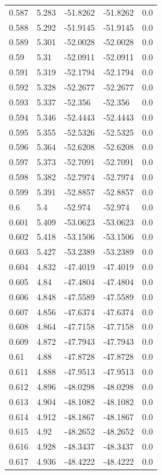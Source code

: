 \begin{table}[H]
\begin{tabular}{lllll}
0.587 & 5.283 & -51.8262 & -51.8262 & 0.0 \\
0.588 & 5.292 & -51.9145 & -51.9145 & 0.0 \\
0.589 & 5.301 & -52.0028 & -52.0028 & 0.0 \\
0.59 & 5.31 & -52.0911 & -52.0911 & 0.0 \\
0.591 & 5.319 & -52.1794 & -52.1794 & 0.0 \\
0.592 & 5.328 & -52.2677 & -52.2677 & 0.0 \\
0.593 & 5.337 & -52.356 & -52.356 & 0.0 \\
0.594 & 5.346 & -52.4443 & -52.4443 & 0.0 \\
0.595 & 5.355 & -52.5326 & -52.5325 & 0.0 \\
0.596 & 5.364 & -52.6208 & -52.6208 & 0.0 \\
0.597 & 5.373 & -52.7091 & -52.7091 & 0.0 \\
0.598 & 5.382 & -52.7974 & -52.7974 & 0.0 \\
0.599 & 5.391 & -52.8857 & -52.8857 & 0.0 \\
0.6 & 5.4 & -52.974 & -52.974 & 0.0 \\
0.601 & 5.409 & -53.0623 & -53.0623 & 0.0 \\
0.602 & 5.418 & -53.1506 & -53.1506 & 0.0 \\
0.603 & 5.427 & -53.2389 & -53.2389 & 0.0 \\
0.604 & 4.832 & -47.4019 & -47.4019 & 0.0 \\
0.605 & 4.84 & -47.4804 & -47.4804 & 0.0 \\
0.606 & 4.848 & -47.5589 & -47.5589 & 0.0 \\
0.607 & 4.856 & -47.6374 & -47.6374 & 0.0 \\
0.608 & 4.864 & -47.7158 & -47.7158 & 0.0 \\
0.609 & 4.872 & -47.7943 & -47.7943 & 0.0 \\
0.61 & 4.88 & -47.8728 & -47.8728 & 0.0 \\
0.611 & 4.888 & -47.9513 & -47.9513 & 0.0 \\
0.612 & 4.896 & -48.0298 & -48.0298 & 0.0 \\
0.613 & 4.904 & -48.1082 & -48.1082 & 0.0 \\
0.614 & 4.912 & -48.1867 & -48.1867 & 0.0 \\
0.615 & 4.92 & -48.2652 & -48.2652 & 0.0 \\
0.616 & 4.928 & -48.3437 & -48.3437 & 0.0 \\
0.617 & 4.936 & -48.4222 & -48.4222 & 0.0 \\

\end{tabular}
\end{table}
